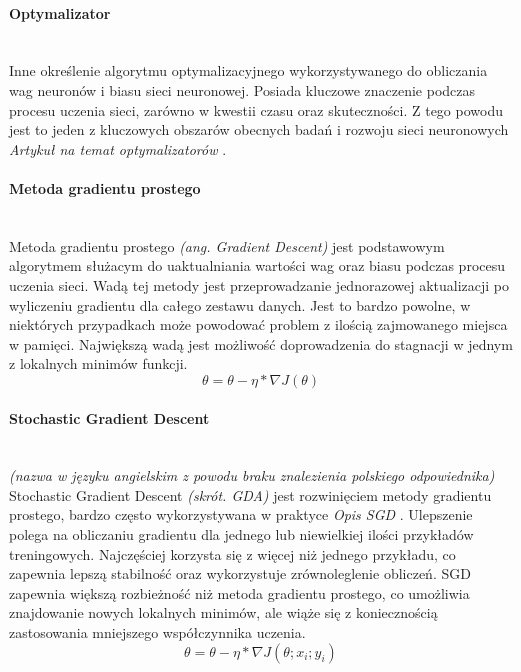 \paragraph{Optymalizator} \mbox{}\\
Inne określenie algorytmu optymalizacyjnego wykorzystywanego do obliczania wag neuronów
i biasu sieci neuronowej. Posiada kluczowe znaczenie podczas procesu uczenia sieci,
zarówno w kwestii czasu oraz skuteczności. Z tego powodu jest to jeden z kluczowych
obszarów obecnych badań i rozwoju sieci neuronowych \textit{Artykuł na temat optymalizatorów} \cite{typesOfOptimizationAlgorithms}.

\paragraph{Metoda gradientu prostego} \mbox{}\\
Metoda gradientu prostego \textit{(ang. Gradient Descent)} jest podstawowym algorytmem
służacym do uaktualniania wartości wag oraz biasu podczas procesu uczenia sieci. Wadą tej
metody jest przeprowadzanie jednorazowej aktualizacji po wyliczeniu gradientu dla
całego zestawu danych. Jest to bardzo powolne, w niektórych przypadkach może powodować
problem z ilością zajmowanego miejsca w pamięci. Największą wadą jest możliwość doprowadzenia
do stagnacji w jednym z lokalnych minimów funkcji.
\begin{equation}
\theta = \theta - \eta * \nabla J(\theta)
\end{equation}

\paragraph{Stochastic Gradient Descent} \mbox{}\\
\textit{(nazwa w języku angielskim z powodu braku znalezienia polskiego odpowiednika)}
Stochastic Gradient Descent \textit{(skrót. GDA)} jest rozwinięciem metody gradientu
prostego, bardzo często wykorzystywana w praktyce \textit{Opis SGD} \cite{OptimizersOverview}.
Ulepszenie polega na obliczaniu gradientu dla jednego lub niewielkiej ilości przykładów
treningowych. Najczęściej korzysta się z więcej niż jednego przykładu, co zapewnia
lepszą stabilność oraz wykorzystuje zrównoleglenie obliczeń. SGD zapewnia większą rozbieżność
niż metoda gradientu prostego, co umożliwia znajdowanie nowych lokalnych minimów, ale
wiąże się z koniecznością zastosowania mniejszego współczynnika uczenia.
\begin{equation}
\theta = \theta - \eta * \nabla J(\theta; x_i; y_i)
\end{equation}

